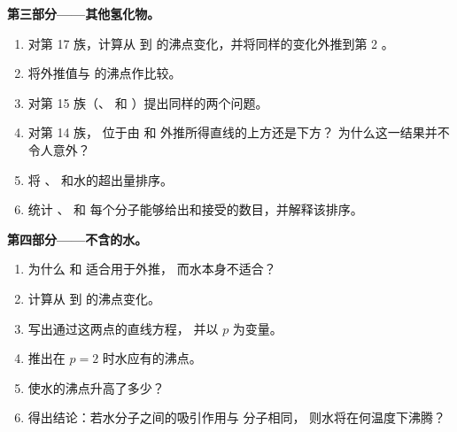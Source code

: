 \begin{problem}
\medskip
\noindent\textbf{第三部分——其他氢化物。}
\begin{enumerate}[resume]
  \item 对第 17 族，计算从  到
         的沸点变化，并将同样的变化外推到第 2 。
  \item 将外推值与  的沸点作比较。
  \item 对第 15 族（、 和
        ）提出同样的两个问题。
  \item 对第 14 族， 位于由  和  外推所得直线的上方还是下方？
        为什么这一结果并不令人意外？
  \item 将 、 和水的超出量排序。
  \item 统计 、 和
         每个分子能够给出和接受的数目，并解释该排序。
\end{enumerate}

\medskip
\noindent\textbf{第四部分——不含的水。}
\begin{enumerate}[resume]
  \item 为什么  和  适合用于外推，
        而水本身不适合？
  \item 计算从  到  的沸点变化。
  \item 写出通过这两点的直线方程，
        并以 $p$ 为变量。
  \item 推出在 $p = 2$ 时水应有的沸点。
  \item {}使水的沸点升高了多少？
  \item 得出结论：若水分子之间的吸引作用与  分子相同，
        则水将在何温度下沸腾？
\end{enumerate}
\end{problem}
